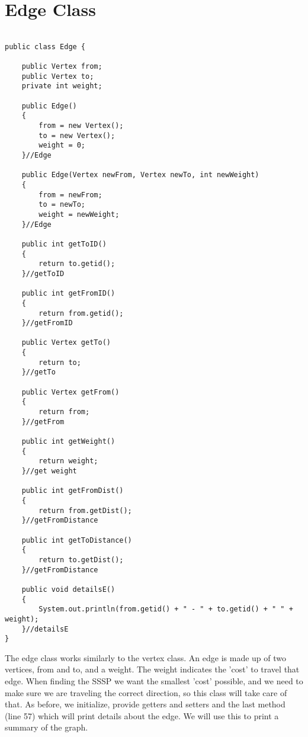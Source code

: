 \documentclass{article}
\begin{document}
\section{Edge Class}
\begin{lstlisting}[frame =single,
backgroundcolor = \color{grey!12}]

public class Edge {

	public Vertex from;
	public Vertex to;
	private int weight;
	
	public Edge()
	{ 
		from = new Vertex();
		to = new Vertex(); 
		weight = 0;
	}//Edge
	
	public Edge(Vertex newFrom, Vertex newTo, int newWeight)
	{
		from = newFrom;
		to = newTo;
		weight = newWeight; 
	}//Edge
	
	public int getToID()
	{
		return to.getid();
	}//getToID
	
	public int getFromID()
	{
		return from.getid();
	}//getFromID
	
	public Vertex getTo()
	{
		return to;
	}//getTo
	
	public Vertex getFrom()
	{
		return from;
	}//getFrom
	
	public int getWeight()
	{
		return weight; 
	}//get weight
	
	public int getFromDist()
	{
		return from.getDist();
	}//getFromDistance
	
	public int getToDistance()
	{
		return to.getDist();
	}//getFromDistance
	
	public void detailsE()
	{
		System.out.println(from.getid() + " - " + to.getid() + " " + weight);
	}//detailsE
}
\end{lstlisting}
\large
The edge class works similarly to the vertex class. An edge is made up of two vertices, from and to, and a weight. The weight indicates the 'cost' to travel that edge. When finding the SSSP we want the smallest 'cost' possible, and we need to make sure we are traveling the correct direction, so this class will take care of that. As before, we initialize, provide getters and setters and the last method (line 57) which will print details about the edge. We will use this to print a summary of the graph. 

\small
\end{document}
